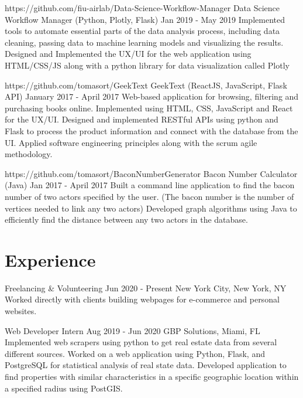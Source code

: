 \documentclass[letterpaper,10pt]{article}
\begin{document}
  \projectHeading
    {https://github.com/fiu-airlab/Data-Science-Workflow-Manager}
    {Data Science Workflow Manager}
    {(Python, Plotly, Flask)}
    {Jan 2019 - May 2019}
  \listStart
    \bulletItem
      {Implemented tools to automate essential parts of the data analysis process, including data cleaning, passing data to machine learning models and visualizing the results.}
    \bulletItem
      {Designed and Implemented the UX/UI for the web application using HTML/CSS/JS along with a python library for data visualization called Plotly}
  \listEnd

  \projectHeading
    {https://github.com/tomasort/GeekText}
    {GeekText}
    {(ReactJS, JavaScript, Flask API)}
    {January 2017 - April 2017}
  \listStart
    \bulletItem
      {Web-based application for browsing, filtering and purchasing books online. Implemented using HTML, CSS, JavaScript and React for the UX/UI. }
    \bulletItem
      {Designed and implemented RESTful APIs using python and Flask to process the product information and connect with the database from the UI. }
    \bulletItem
      {Applied software engineering principles along with the scrum agile methodology.}
  \listEnd

  \projectHeading
    {https://github.com/tomasort/BaconNumberGenerator}
    {Bacon Number Calculator}
    {(Java)}
    {Jan 2017 - April 2017}
  \listStart
    \bulletItem
      {Built a command line application to find the bacon number of two actors specified by the user. (The bacon number is the number of vertices needed to link any two actors) }
    \bulletItem
      {Developed graph algorithms using Java to efficiently find the distance between any two actors in the database. }
  \listEnd



\sectionEnd
  
\section{Experience}
\sectionStart

  \jobHeading
    {Freelancing \& Volunteering}
    {Jun 2020 - Present}
    {New York City, New York, NY}
  \listStart
    \bulletItem
    {Worked directly with clients building webpages for e-commerce and personal websites.}
  \listEnd

  \jobHeading
    {Web Developer Intern}
    {Aug 2019 - Jun 2020}
    {GBP Solutions, Miami, FL}
  \listStart
    \bulletItem
    {Implemented web scrapers using python to get real estate data from several different sources.}
    \bulletItem
    {Worked on a web application using Python, Flask, and PostgreSQL for statistical analysis of real state data.}
    \bulletItem
    {Developed application to find properties with similar characteristics in a specific geographic location within a specified radius using PostGIS.}
  \listEnd
\end{document}
